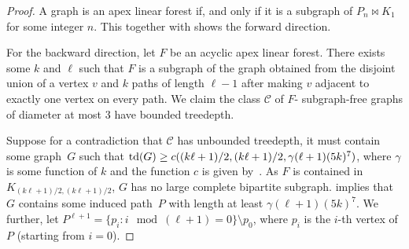 \documentclass[runningheads,envcountsame]{llncs}
\newcommand{\forbiddenGraph}{F}
\newcommand{\join}{\bowtie}
\newcommand{\td}{{\textup{td}}}
\begin{document}
\begin{proof}
  A graph is an apex linear forest if, and only if it is a
  subgraph of $P_n\join K_1$ for some integer $n$. This together with
   shows the forward direction.
  
  For the backward direction, let $\forbiddenGraph$
  be an acyclic apex linear forest. There exists some $k$ and $\ell$
  such that $\forbiddenGraph$ is a subgraph of the graph obtained from
  the disjoint union of a vertex $v$ and $k$ paths of
  length $\ell-1$ after making $v$ adjacent to exactly one vertex on
  every path. We claim the class $\mathcal{C}$ of $\forbiddenGraph$-
  subgraph-free graphs of diameter at most $3$ have bounded treedepth.

  Suppose for a contradiction that $\mathcal{C}$
  has unbounded treedepth, it must contain some graph~$G$ such that 
  $\td(G) \geq c((k \ell +1)/2, (k\ell+1)/2, \gamma(\ell+1)(5k)^7)$,
  where $\gamma$ is some function of $k$
  and the function $c$ is given by~.
  As $\forbiddenGraph$ is contained in
  $K_{(k \ell +1)/2,(k\ell +1)/2}$, $G$ has no large
  complete bipartite subgraph.  implies that $G$
  contains some induced path~$P$ with length at least $\gamma(\ell+1)(5k)^7$. We further,  
  let $P^{\ell+1} = \{ p_i: i \mod (\ell+1)=0 \}
  \setminus p_{0}$, where $p_i$ is the $i$-th vertex of $P$ (starting
  from $i=0$). 
  


\end{proof}
\end{document}
